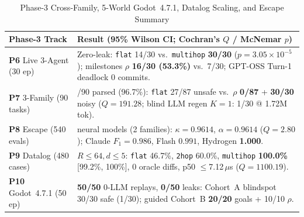 \begin{table}[!tbp]
\caption{Phase-3 Cross-Family, 5-World Godot~4.7.1, Datalog Scaling, and Escape Summary}
\label{tab:phase3-compact}
\centering
\scriptsize
\setlength{\tabcolsep}{3pt}
\begin{tabularx}{\columnwidth}{@{}>{\raggedright\arraybackslash}p{}>{\raggedright\arraybackslash}X@{}}
\toprule
\textbf{Phase-3 Track} & \textbf{Result (95\% Wilson CI; Cochran's $Q$ / McNemar $p$)} \\
\midrule
\textbf{P6} Live 3-Agent (30 ep) & Zero-leak: \texttt{flat} 14/30 vs.\ \texttt{multihop} \textbf{30/30} ($p{=}3.05{\times}10^{-5}$); milestones $\rho$ \textbf{16/30 (53.3\%)} vs.\ 7/30; GPT-OSS Turn-1 deadlock 0 commits. \\
\textbf{P7} 3-Family (90 tasks) & 87/90 parsed (96.7\%): \texttt{flat} 27/87 unsafe vs.\ $\rho$ \textbf{0/87} + \textbf{30/30} noisy ($Q{=}191.28$; blind LLM regen $K{=}1$: 1/30 @ 1.72M tok). \\
\textbf{P8} Escape (540 evals) & 3 neural models (2 families): $\kappa{=}\mathbf{0.9614}$, $\alpha{=}\mathbf{0.9614}$ ($Q{=}2.80$); Claude $F_1{=}0.986$, Flash $0.991$, Hydrogen \textbf{1.000}. \\
\textbf{P9} Datalog (480 cases) & $R{\le}64,d{\le}5$: \texttt{flat} 46.7\%, \texttt{2hop} 60.0\%, \texttt{multihop} \textbf{100.0\%} [99.2\%, 100\%], 0 oracle diffs, p50 $\le$7.12\,$\mu$s ($Q{=}1100.19$). \\
\textbf{P10} Godot~4.7.1 (50 ep) & \textbf{50/50} 0-LLM replays, \textbf{0/50} leaks: Cohort~A blindspot 30/30 safe (1/30); guided Cohort~B \textbf{20/20} goals + 10/10 $\rho$. \\
\bottomrule
\end{tabularx}
\end{table}
